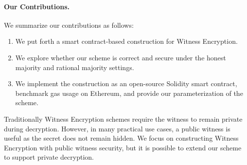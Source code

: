 \paragraph{Our Contributions.} We summarize our contributions as follows:
\begin{enumerate}
    \item We put forth a smart contract-based construction for Witness Encryption.
    \item We explore whether our scheme is correct and secure under the honest majority and rational majority settings.
    \item We implement the construction as an open-source Solidity smart contract, benchmark gas usage on Ethereum, and provide our parameterization of the scheme.
\end{enumerate}

Traditionally Witness Encryption schemes require the witness to remain private during decryption.
However, in many practical use cases, a public witness is useful as the secret does not remain hidden.
We focus on constructing Witness Encryption with public witness security, but it is possible to extend our scheme to support private decryption.